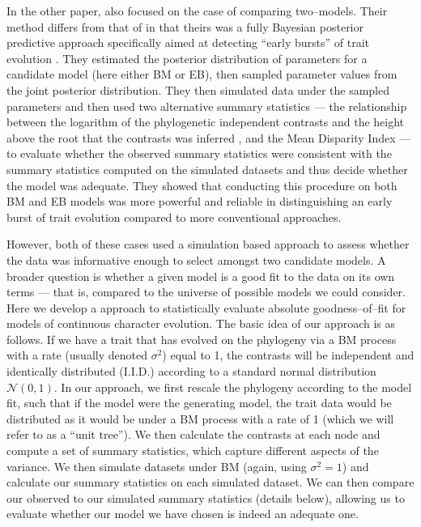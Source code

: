 \documentclass[12pt]{article}
\begin{document}
In the other paper, \citet{SlaterPennell} also focused on the case of comparing two--models. Their method differs from that of \citet{Boettiger2012} in that theirs was a fully Bayesian posterior predictive approach specifically aimed at detecting ``early bursts'' of trait evolution \citep[\textit{sensu}][]{Simpson1944, Simpson1953, Harmon2010}. They estimated the posterior distribution of parameters for a candidate model (here either BM or EB), then sampled parameter values from the joint posterior distribution. They then simulated data under the sampled parameters and then used two alternative summary statistics --- the relationship between the logarithm of the phylogenetic independent contrasts and the height above the root that the contrasts was inferred \citep[a.k.a. the ``node height test'';][]{FreckletonHarvey2006}, and the Mean Disparity Index \citep[MDI;][]{Harmon2003, Slater2010} --- to evaluate whether the observed summary statistics were consistent with the summary statistics computed on the simulated datasets and thus decide whether the model was adequate. They showed that conducting this procedure on both BM and EB models was more powerful and reliable in distinguishing an early burst of trait evolution compared to more conventional approaches.

However, both of these cases used a simulation based approach to assess whether the data was informative enough to select amongst two candidate models. A broader question is whether a given model is a good fit to the data on its own terms --- that is, compared to the universe of possible models we could consider. Here we develop a approach to statistically evaluate absolute goodness--of--fit for models of continuous character evolution. The basic idea of our approach is as follows. If we have a trait that has evolved on the phylogeny via a BM process with a rate (usually denoted $\sigma^2$) equal to 1, the contrasts \citep[\textit{sensu}][see below]{Felsenstein1985} will be independent and identically distributed (I.I.D.) according to a standard normal distribution $\mathcal{N}(0,1)$. In our approach, we first rescale the phylogeny according to the model fit, such that if the model were the generating model, the trait data would be distributed as it would be under a BM process with a rate of 1 (which we will refer to as a ``unit tree''). We then calculate the contrasts at each node and compute a set of summary statistics, which capture different aspects of the variance. We then simulate datasets under BM (again, using $\sigma^2 = 1$) and calculate our summary statistics on each simulated dataset. We can then compare our observed to our simulated summary statistics (details below), allowing us to evaluate whether our model we have chosen is indeed an adequate one.
\end{document}

